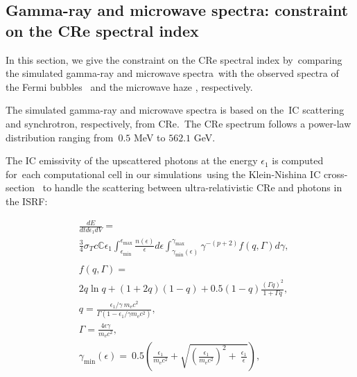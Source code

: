 \documentclass[twocolumn]{aastex631}
\begin{document}
\subsection{Gamma-ray and microwave spectra: constraint on the CRe spectral index}
\label{sec:gamma-ray-microwave}
In this section, we give the constraint on the CRe spectral index by\
comparing the simulated gamma-ray and microwave spectra\
with the observed spectra of the Fermi bubbles \citep{Ackermann2014}\
and the microwave haze \citep{Dobler_2008}, respectively.\

The simulated gamma-ray and microwave spectra is based on the\
IC scattering and synchrotron, respectively, from CRe.\
The CRe spectrum follows a power-law distribution ranging from\
$0.5$ MeV to $562.1$ GeV.


The IC emissivity of the upscattered photons at the energy $\epsilon_{1}$ is computed for\
each computational cell in our simulations\
using the Klein-Nishina IC cross-section \citep{Jones1968,BLUMENTHAL1970}\
to handle the scattering between ultra-relativistic CRe and photons in the ISRF:

\begin{subequations}
  \begin{align}
  &\frac{dE}{dtd\epsilon_{1}dV} =\nonumber\\
               &\frac{3}{4}\sigma_{T}c\mathbb{C}\epsilon_{1}\int^{\epsilon_{\text{max}}}_{\epsilon_{\text{min}}}
               \frac{n(\epsilon)}{\epsilon}d\epsilon\int^{\gamma_{\text{max}}}_{\gamma_{\text{min}}\left(\epsilon\right)}
               \gamma^{-(p+2)}f(q, \Gamma)d\gamma,\\
  \nonumber\\
  &f(q, \Gamma) =\nonumber\\
               &2q\ln q+(1+2q)(1-q)+0.5(1-q)\frac{\left(\Gamma q\right)^2}{1+\Gamma q},\\
  &q=\frac{\epsilon_{1}/\gamma\
               m_{\text{e}}c^{2}}{\Gamma\left(1-\epsilon_{1}/\gamma m_{\text{e}}c^{2}\right)},\\
  &\Gamma=\frac{4\epsilon \gamma}{m_{\text{e}}c^2},\\
  &\gamma_{\text{min}}(\epsilon)=\
   0.5\left(\frac{\epsilon_{1}}{m_{\text{e}}c^2}+\sqrt{\left(\frac{\epsilon_{1}}{m_{\text{e}}c^2}\right)^2+\
   \frac{\epsilon_{1}}{\epsilon}}\right) \label{gamma-min},
  \end{align}
\label{gammaray-emissivity}
\end{subequations}
\end{document}
